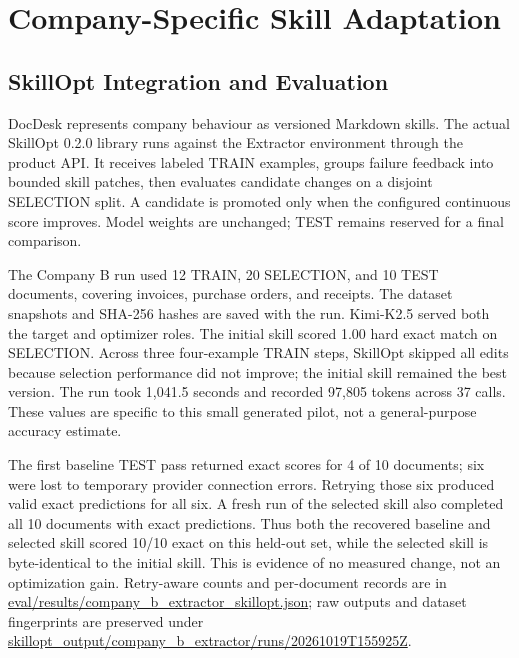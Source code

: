 \section{Company-Specific Skill Adaptation}
\label{sec:skillopt}

\subsection{SkillOpt Integration and Evaluation}

DocDesk represents company behaviour as versioned Markdown skills. The actual
SkillOpt 0.2.0 library runs against the Extractor environment through the
product API. It receives labeled TRAIN examples, groups failure feedback into
bounded skill patches, then evaluates candidate changes on a disjoint SELECTION
split. A candidate is promoted only when the configured continuous score
improves. Model weights are unchanged; TEST remains reserved for a final
comparison.

The Company B run used 12 TRAIN, 20 SELECTION, and 10 TEST documents, covering
invoices, purchase orders, and receipts. The dataset snapshots and SHA-256
hashes are saved with the run. Kimi-K2.5 served both the target and optimizer
roles. The initial skill scored 1.00 hard exact match on SELECTION. Across
three four-example TRAIN steps, SkillOpt skipped all edits because selection
performance did not improve; the initial skill remained the best version. The
run took 1,041.5 seconds and recorded 97,805 tokens across 37 calls. These
values are specific to this small generated pilot, not a general-purpose
accuracy estimate.

The first baseline TEST pass returned exact scores for 4 of 10 documents; six
were lost to temporary provider connection errors. Retrying those six produced
valid exact predictions for all six. A fresh run of the selected skill also
completed all 10 documents with exact predictions. Thus both the recovered
baseline and selected skill scored 10/10 exact on this held-out set, while the
selected skill is byte-identical to the initial skill. This is evidence of no
measured change, not an optimization gain. Retry-aware counts and per-document
records are in \url{eval/results/company_b_extractor_skillopt.json}; raw
outputs and dataset fingerprints are preserved under
\url{skillopt_output/company_b_extractor/runs/20261019T155925Z}.

